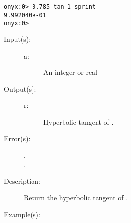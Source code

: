 \begin{description}
\begin{description}
\begin{verbatim}
onyx:0> 0.785 tan 1 sprint
9.992040e-01
onyx:0>
		\end{verbatim}
	\end{description}
\label{systemdict:tanh}
\item[{\onyxop{a}{tanh}{r}}: ]
	\begin{description}\item[]
	\item[Input(s): ]
		\begin{description}\item[]
		\item[a: ]
			An integer or real.
		\end{description}
	\item[Output(s): ]
		\begin{description}\item[]
		\item[r: ]
			Hyperbolic tangent of .
		\end{description}
	\item[Error(s): ]
		\begin{description}\item[]
		\item[.]
		\item[.]
		\end{description}
	\item[Description: ]
		Return the hyperbolic tangent of .
	\item[Example(s): ]\begin{verbatim}


\end{verbatim}
\end{description}
\end{description}
